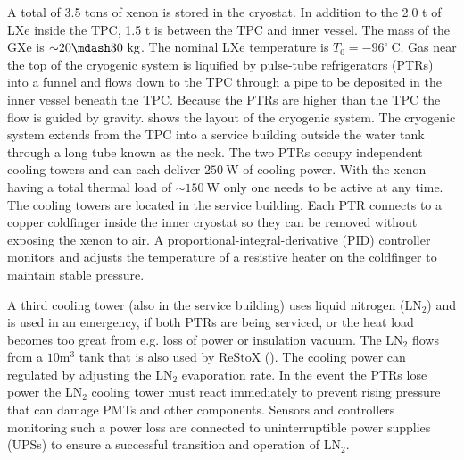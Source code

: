 A total of 3.5 tons of xenon is stored in the cryostat.  In addition to the 2.0 t of LXe inside the TPC, 1.5 t is between the
TPC and inner vessel.  The mass of the GXe is ${\sim} 20 \mdash 30\ \mathrm{kg}$.  The nominal LXe temperature is
$T_{0} = -96^{\circ}\ \mathrm{C}$.  Gas near the top of
the cryogenic system is liquified by pulse-tube refrigerators (PTRs) into a funnel and flows down to the TPC through a pipe to be
deposited in the inner vessel beneath the TPC.  Because
the PTRs are higher than the TPC the flow is guided by gravity.   shows the layout of the
cryogenic
system.  The cryogenic system extends from the TPC into a service building outside the water tank through a long tube known as the
neck.  The two PTRs occupy independent
cooling towers and can each deliver $250\ \mathrm{W}$ of cooling power.  With the xenon
having a total thermal load of ${\sim} 150\ \mathrm{W}$ only one needs to be active at any time.  The cooling towers
are located in the service building.  Each PTR connects to a copper coldfinger
inside the inner cryostat so they can be removed without exposing the xenon to air.  A proportional-integral-derivative (PID) controller
monitors and adjusts the temperature of a resistive heater on the coldfinger to maintain stable pressure.

A third cooling tower (also in the service building) uses liquid nitrogen ($\mathrm{LN_2}$) and is used in an emergency, if both PTRs are
being serviced, or the
heat load becomes too great from e.g. loss of power or insulation vacuum.  The $\mathrm{LN_2}$ flows from a $10 \mathrm{m^3}$ tank that
is also used by ReStoX ().  The cooling power can regulated by adjusting the $\mathrm{LN_2}$ evaporation
rate.  In the event the PTRs
lose power the $\mathrm{LN_2}$ cooling tower must react immediately to prevent rising pressure that can damage PMTs and other
components.  Sensors and controllers monitoring such a power loss are connected to uninterruptible power supplies (UPSs) to ensure a
successful transition and operation of $\mathrm{LN_2}$.

